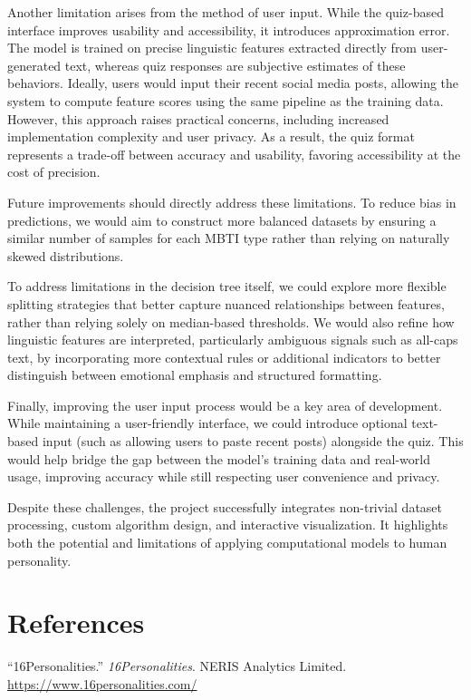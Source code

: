 \documentclass[11pt]{article}
\begin{document}
Another limitation arises from the method of user input. While the quiz-based interface improves usability and accessibility, it introduces approximation error. The model is trained on precise linguistic features extracted directly from user-generated text, whereas quiz responses are subjective estimates of these behaviors. Ideally, users would input their recent social media posts, allowing the system to compute feature scores using the same pipeline as the training data. However, this approach raises practical concerns, including increased implementation complexity and user privacy. As a result, the quiz format represents a trade-off between accuracy and usability, favoring accessibility at the cost of precision.

Future improvements should directly address these limitations. To reduce bias in predictions, we would aim to construct more balanced datasets by ensuring a similar number of samples for each MBTI type rather than relying on naturally skewed distributions. 

To address limitations in the decision tree itself, we could explore more flexible splitting strategies that better capture nuanced relationships between features, rather than relying solely on median-based thresholds. We would also refine how linguistic features are interpreted, particularly ambiguous signals such as all-caps text, by incorporating more contextual rules or additional indicators to better distinguish between emotional emphasis and structured formatting.

Finally, improving the user input process would be a key area of development. While maintaining a user-friendly interface, we could introduce optional text-based input (such as allowing users to paste recent posts) alongside the quiz. This would help bridge the gap between the model’s training data and real-world usage, improving accuracy while still respecting user convenience and privacy.

Despite these challenges, the project successfully integrates non-trivial dataset processing, custom algorithm design, and interactive visualization. It highlights both the potential and limitations of applying computational models to human personality.

\section*{References}
“16Personalities.” \textit{16Personalities}. NERIS Analytics Limited. \\ \url{https://www.16personalities.com/}
    
\end{document}
